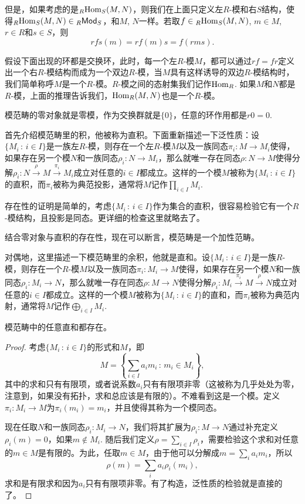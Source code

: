 但是，如果考虑的是${}_R\!\operatorname{Hom}_S(M,N)$，则我们在上面只定义左$R$-模和右$S$结构，使得${}_R\!\operatorname{Hom}_S(M,N)\in {}_R\mathsf{Mod}_S$，和$M$, $N$一样。若取$f\in {}_R\!\operatorname{Hom}_S(M,N)$, $m\in M$, $r\in R$和$s\in S$，则
\[
	rfs(m)=rf(m)s=f(rms).
\]

假设下面出现的环都是交换环，此时，每一个左$R$-模$M$，都可以通过$rf=fr$定义出一个右$R$-模结构而成为一个双边$R$-模，当$M$具有这样诱导的双边$R$-模结构时，我们简单称呼$M$是一个$R$-模。$R$-模之间的态射集我们记作$\operatorname{Hom}_R$. 如果$M$和$N$都是$R$-模，上面的推理告诉我们，$\operatorname{Hom}_R(M,N)$也是一个$R$-模。

\begin{para}[零对象]
模范畴的零对象就是零模，作为交换群就是$\{0\}$，任意的环作用都是$r0=0$.
\end{para}

\begin{para}[直积]
首先介绍模范畴里的积，他被称为直积。下面重新描述一下泛性质：设$\{M_i\,:\, i\in I\}$是一族左$R$-模，则存在一个左$R$-模$M$以及一族同态$\pi_i:M\to M_i$使得，如果存在另一个模$N$和一族同态$\rho_i:N\to M_i$，那么就唯一存在同态$\rho:N\to M$使得分解$\rho_i:N\xrightarrow{\rho} M \xrightarrow{\pi_i} M_i$成立对任意的$i\in I$都成立。这样的一个模$M$被称为$\{M_i\,:\, i\in I\}$的直积，而$\pi_i$被称为典范投影，通常将$M$记作$\prod_{i\in I}M_i$. 

存在性的证明是简单的，考虑$\{M_i\,:\, i\in I\}$作为集合的直积，很容易检验它有一个$R$-模结构，且投影是同态。更详细的检查这里就略去了。
\end{para}

结合零对象与直积的存在性，现在可以断言，模范畴是一个加性范畴。

\begin{para}[直和]
对偶地，这里描述一下模范畴里的余积，他就是直和。设$\{M_i\,:\, i\in I\}$是一族$R$-模，则存在一个$R$-模$M$以及一族同态$\pi_i:M_i\to M$使得，如果存在另一个模$N$和一族同态$\rho_i:M_i\to N$，那么就唯一存在同态$\rho:M\to N$使得分解$\rho_i:M_i\xrightarrow{\pi_i} M \xrightarrow{\rho} N$成立对任意的$i\in I$都成立。这样的一个模$M$被称为$\{M_i\,:\, i\in I\}$的直和，而$\pi_i$被称为典范内射，通常将$M$记作$\bigoplus_{i\in I}M_i$. 
\end{para}

\begin{pro}
	模范畴中的任意直和都存在。
\end{pro}

\begin{proof}
考虑$\{M_i\,:\, i\in I\}$的形式和$M$，即
\[
	M=\left\{\sum_{i\in I} a_i m_i\,:\, m_i\in M_i\right\},
\]
其中的求和只有有限项，或者说系数$a_i$只有有限项非零（这被称为几乎处处为零，注意到，如果没有拓扑，求和总应该是有限的）。不难看到这是一个模。定义$\pi_i:M_i\to M$为$\pi_i(m_i)=m_i$，并且使得其称为一个模同态。

现在任取$N$和一族同态$\rho_i:M_i\to N$，我们将其扩展为$\rho_i:M\to N$通过补充定义$\rho_i(m)=0$，如果$m\notin M_i$. 随后我们定义$\rho = \sum_{i\in I} \rho_i$，需要检验这个求和对任意的$m\in M$是有限的。为此，任取$m\in M$，由于他可以分解成$m=\sum_i a_i m_i$，所以
\[
	\rho(m)=\sum_i a_i \rho_i(m_i),
\]
求和是有限求和因为$a_i$只有有限项非零。有了构造，泛性质的检验就是直接的了。
\end{proof}

